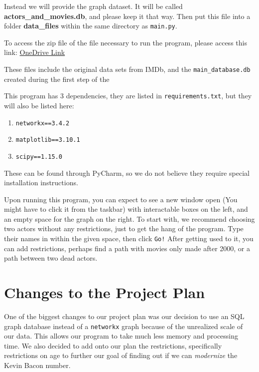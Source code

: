 \documentclass{article}
\begin{document}
Instead we will provide the graph dataset. It will be called \textbf{actors\_and\_movies.db}, and please keep it that way. Then put this file into a folder \textbf{data\_files} within the same directory as \verb!main.py!.

To access the zip file of the file necessary to run the program, please access this link: \href{https://utoronto-my.sharepoint.com/:u:/g/personal/nabhan_rashid_mail_utoronto_ca/EYMbuqB8-ARIrHxDK7YhbWkBS4cH6Imba-6myQPnr1z57w?e=JQY8F9}{OneDrive Link}

These files include the original data sets from IMDb, and the \verb!main_database.db! created during the first step of the

This program has 3 dependencies, they are listed in \verb!requirements.txt!, but they will also be listed here:
\begin{enumerate}
\item \verb!networkx==3.4.2!
\item \verb!matplotlib==3.10.1!
\item \verb!scipy==1.15.0!
\end{enumerate}
These can be found through PyCharm, so we do not believe they require special installation instructions.

Upon running this program, you can expect to see a new window open (You might have to click it from the taskbar) with interactable boxes on the left, and an empty space for the graph on the right. To start with, we recommend choosing two actors without any restrictions, just to get the hang of the program. Type their names in within the given space, then click \verb+Go!+ After getting used to it, you can add restrictions, perhaps find a path with movies only made after 2000, or a path between two dead actors.

\section{Changes to the Project Plan}
One of the biggest changes to our project plan was our decision to use an SQL graph database instead of a \verb!networkx! graph because of the unrealized scale of our data. This allows our program to take much less memory and processing time. We also decided to add onto our plan the restrictions, specifically restrictions on age to further our goal of finding out if we can \emph{modernize} the Kevin Bacon number.
\end{document}
